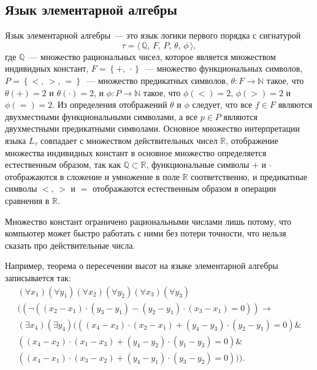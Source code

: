 \subsection{Язык элементарной алгебры}

Язык элементарной алгебры~--- это язык логики первого порядка с сигнатурой
\begin{equation*}
    \tau = \langle \, \mathbb{Q},\, F,\, P,\, \theta,\, \phi \, \rangle,
\end{equation*}
где $\mathbb{Q}$~--- множество рациональных чисел, которое является множеством индивидных констант, $F =  \left\{+,\, \cdot\right\}$~--- множество функциональных символов, $P = \left\{ <,\, >,\, = \right\}$~--- множество предикатных символов, $\theta : F \rightarrow \mathbb{N}$ такое, что $\theta(+) = 2$ и $\theta(\cdot) = 2$, и $\phi : P \rightarrow \mathbb{N}$ такое, что $\phi(<) = 2$, $\phi(>) = 2$ и $\phi(=) = 2$. Из определения отображений $\theta$ и $\phi$ следует, что все $f \in F$ являются двухместными функциональными символами, а все $p \in P$ являются двухместными предикатными символами. Основное множество интерпретации языка $L_\tau $ совпадает с множеством действительных чисел $\mathbb{R}$, отображение множества индивидных констант в основное множество определяется естественным образом, так как $\mathbb{Q} \subset \mathbb{R}$, функциональные символы $+$ и $\cdot$ отображаются в сложение и умножение в поле $\mathbb{R}$ соответственно, и предикатные символы $<$, $>$ и $=$ отображаются естественным образом в операции сравнения в $\mathbb{R}$.

    Множество констант ограничено рациональными числами лишь потому, что компьютер может быстро работать с ними без потери точности, что нельзя сказать про действительные числа.

Например, теорема о пересечении высот на языке элементарной алгебры записывается так:
\begin{gather*}
    (\forall x_1)(\forall y_1)(\forall x_2)(\forall y_2)(\forall x_3)(\forall y_3) \\
    (
        (
            \lnot
            (
                (x_2 - x_1)\cdot(y_3 - y_1) - (y_2 - y_1)\cdot(x_3 - x_1) = 0
            )
        )
        \to \\
        (\exists x_4)(\exists y_4)
        (
           (
                (x_4 - x_3)\cdot(x_2 - x_1) + (y_4 - y_3)\cdot(y_2 - y_1) = 0
            ) \& \\
            (
                (x_4 - x_2)\cdot(x_1 - x_3) + (y_4 - y_2)\cdot(y_1 - y_3) = 0
            ) \& \\
            (
                (x_4 - x_1)\cdot(x_3 - x_2) + (y_4 - y_1)\cdot(y_3 - y_2) = 0
            )
        )
    ).
\end{gather*}

